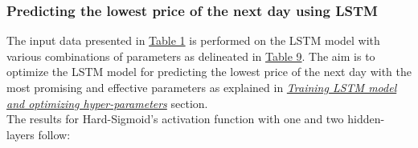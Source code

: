 \subsubsection{Predicting the lowest price of the next day using LSTM}
\label{chap:Predicting the lowest price of the next day using LSTM}

\quad The input data presented in \hyperref[table:TrainingFeatures]{Table 1} is performed on the LSTM model with various combinations of parameters as delineated in \hyperref[table:Hyper-parameters for LSTM]{Table 9}. The aim is to optimize the LSTM model for predicting the lowest price of the next day with the most promising and effective parameters as explained in \hyperref[chap:Training LSTM model and optimizing hyper-parameters]{\textit{Training LSTM model and optimizing hyper-parameters}} section.\\

The results for Hard-Sigmoid's activation function with one and two hidden-layers follow:

